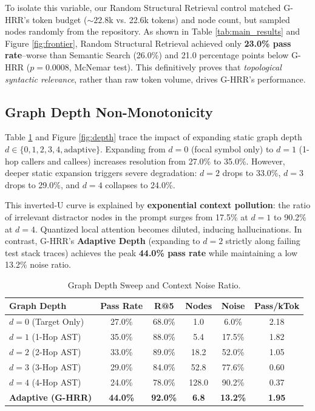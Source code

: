 \documentclass[10pt,twocolumn,letterpaper]{article}
\begin{document}
To isolate this variable, our Random Structural Retrieval control matched G-HRR's token budget ($\sim 22.8$k vs. 22.6k tokens) and node count, but sampled nodes randomly from the repository. As shown in Table \ref{tab:main_results} and Figure \ref{fig:frontier}, Random Structural Retrieval achieved only \textbf{23.0\% pass rate}--worse than Semantic Search (26.0\%) and 21.0 percentage points below G-HRR ($p = 0.0008$, McNemar test). This definitively proves that \textit{topological syntactic relevance}, rather than raw token volume, drives G-HRR's performance.

\subsection{Graph Depth Non-Monotonicity}
Table \ref{tab:depth} and Figure \ref{fig:depth} trace the impact of expanding static graph depth $d \in \{0, 1, 2, 3, 4, \text{adaptive}\}$. Expanding from $d=0$ (focal symbol only) to $d=1$ (1-hop callers and callees) increases resolution from 27.0\% to 35.0\%. However, deeper static expansion triggers severe degradation: $d=2$ drops to 33.0\%, $d=3$ drops to 29.0\%, and $d=4$ collapses to 24.0\%.

This inverted-U curve is explained by \textbf{exponential context pollution}: the ratio of irrelevant distractor nodes in the prompt surges from 17.5\% at $d=1$ to 90.2\% at $d=4$. Quantized local attention becomes diluted, inducing hallucinations. In contrast, G-HRR's \textbf{Adaptive Depth} (expanding to $d=2$ strictly along failing test stack traces) achieves the peak \textbf{44.0\% pass rate} while maintaining a low 13.2\% noise ratio.

\begin{table}[h]
\centering
\small
\setlength{\tabcolsep}{3pt}
\caption{Graph Depth Sweep and Context Noise Ratio.}
\label{tab:depth}
\begin{tabular}{lccccc}
\toprule
\textbf{Graph Depth} & \textbf{Pass Rate} & \textbf{R@5} & \textbf{Nodes} & \textbf{Noise} & \textbf{Pass/kTok} \\
\midrule
$d = 0$ (Target Only) & 27.0\% & 68.0\% & 1.0 & 6.0\% & 2.18 \\
$d = 1$ (1-Hop AST) & 35.0\% & 88.0\% & 5.4 & 17.5\% & 1.82 \\
$d = 2$ (2-Hop AST) & 33.0\% & 89.0\% & 18.2 & 52.0\% & 1.05 \\
$d = 3$ (3-Hop AST) & 29.0\% & 84.0\% & 52.8 & 77.6\% & 0.60 \\
$d = 4$ (4-Hop AST) & 24.0\% & 78.0\% & 128.0 & 90.2\% & 0.37 \\
\textbf{Adaptive (G-HRR)} & \textbf{44.0\%} & \textbf{92.0\%} & \textbf{6.8} & \textbf{13.2\%} & \textbf{1.95} \\
\bottomrule
\end{tabular}
\end{table}
\end{document}
